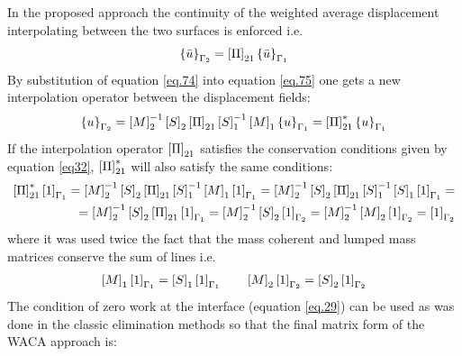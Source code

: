 In the proposed approach the continuity of the weighted average displacement interpolating between the two surfaces is enforced i.e.
\begin{equation}
\label{eq.75}
\left\lbrace{\bar{u}}\right \rbrace_{\Gamma_2}=\left[{\Pi}\right]_{21}\left\lbrace{\bar{u}}\right \rbrace_{\Gamma_1}
\end{equation}
By substitution of equation \eqref{eq.74}  into equation  \eqref{eq.75} one gets a new interpolation operator between the displacement fields:
\begin{equation}
\label{eq.76}
\left\lbrace{u}\right \rbrace_{\Gamma_2}=\left[{M}\right]_{2}^{-1}\left[{S}\right]_2\left[{\Pi}\right]_{21}\left[{S}\right]_1^{-1}\left[{M}\right]_{1}\left\lbrace{u}\right \rbrace_{\Gamma_1}=\left[{\Pi}\right]_{21}^{*}\left\lbrace{u}\right \rbrace_{\Gamma_1}
\end{equation}
If the interpolation operator $\left[{\Pi}\right]_{21}$ satisfies the conservation conditions given by equation \eqref{eq32}, $\left[{\Pi}\right]^{*}_{21}$ will also satisfy the same conditions:
\begin{equation}
\label{eq.77}
\begin{aligned}
\left[{\Pi}\right]_{21}^{*}\left[{1}\right]_{\Gamma_1}=\left[{M}\right]_{2}^{-1}\left[{S}\right]_2\left[{\Pi}\right]_{21}\left[{S}\right]_1^{-1}\left[{M}\right]_{1}\left[{1}\right]_{\Gamma_1}=\left[{M}\right]_{2}^{-1}\left[{S}\right]_2\left[{\Pi}\right]_{21}\left[{S}\right]_1^{-1}\left[{S}\right]_1\left[{1}\right]_{\Gamma_1}=\\=
\left[{M}\right]_{2}^{-1}\left[{S}\right]_2\left[{\Pi}\right]_{21}\left[{1}\right]_{\Gamma_1}=\left[{M}\right]_{2}^{-1}\left[{S}\right]_2\left[{1}\right]_{\Gamma_2}=\left[{M}\right]_{2}^{-1}\left[{M}\right]_{2}\left[{1}\right]_{\Gamma_2}=\left[{1}\right]_{\Gamma_2}
\end{aligned}
\end{equation}
where it was used twice the fact that the mass coherent and lumped mass matrices conserve the sum of lines i.e.
\begin{eqnarray}
\label{eq.78}
\left[{M}\right]_{1}\left[{1}\right]_{\Gamma_1}=\left[{S}\right]_{1}\left[{1}\right]_{\Gamma_1} \qquad \left[{M}\right]_{2}\left[{1}\right]_{\Gamma_2}=\left[{S}\right]_{2}\left[{1}\right]_{\Gamma_2} 
\end{eqnarray}
The condition of zero work at the interface (equation \eqref{eq.29}) can be used as was done in the classic elimination methods so that the final matrix form of the WACA approach is:
